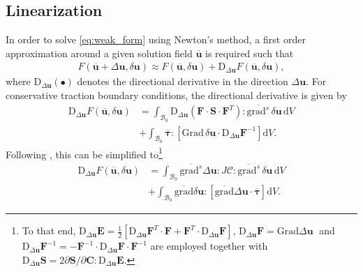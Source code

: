 \documentclass[times,doublespace]{nmeauth}
\newcommand*{\gz}[1]{\boldsymbol{#1}}
\newcommand*{\Grad}{\mathrm{Grad}}
\newcommand*{\grad}{\mathrm{grad}}
\renewcommand*{\d}{\mathrm{d}}
\newcommand*{\D}{\mathrm{D}}
\newcommand*{\mcl}[1]{\mathcal{#1}}
\begin{document}
\subsection{Linearization}

In order to solve \eqref{eq:weak_form} using Newton's method, a first order approximation around a given solution field $\overline{\gz u}$ is required such that
\begin{align}
F(\overline{\gz u} + \Delta \gz u, \delta \gz u) \approx
F(\overline{\gz u}, \delta \gz u) + \D_{\displaystyle \Delta \gz u} F(\overline{\gz u}, \delta \gz u) ,
\end{align}
where $\D_{\displaystyle \Delta \gz u}(\bullet)$ denotes the directional derivative in the direction $\Delta \gz u$.
For conservative traction boundary conditions, the directional derivative is given by
\begin{equation}
\begin{split}
\D_{\displaystyle \Delta \gz u} F(\overline{\gz u}, \delta \gz u)
&=
\int_{\mcl B_0}
\D_{\displaystyle \Delta \gz u} \left(\gz F \cdot \gz S \cdot \gz F^T\right)  :
\overline{\grad^s} \, \delta \gz u
\, \d V
\\
& +
\int_{\mcl B_0}
\overline{\gz \tau} :
\left[
  \Grad \, \delta \gz u \cdot
  \D_{\displaystyle \Delta \gz u} \gz F^{-1}
\right] \d V.
\end{split}
\label{eq:tangent_pre}
\end{equation}
Following \cite{Wriggers2008}, this can be simplified to\footnote{To that end,
$\!\D_{\displaystyle \Delta \gz u} \gz E = \frac{1}{2}\left[\D_{\displaystyle \Delta \gz u} \gz F^T \cdot \gz F + \gz F^T \cdot \D_{\displaystyle \Delta \gz u} \gz F\right]$, $\D_{\displaystyle \Delta \gz u} \gz F = \Grad \Delta \gz u\;$  and
$\!\D_{\displaystyle \Delta \gz u} \gz F^{-1} = - \gz F^{-1} \cdot \D_{\displaystyle \Delta \gz u} \gz F \cdot \gz F^{-1}$
are employed together with
$\D_{\displaystyle \Delta \gz u} \gz S = 2 \partial \gz S / \partial \gz C : \D_{\displaystyle \Delta \gz u} \gz E$.
}
\begin{equation}
  \begin{split}
\D_{\displaystyle \Delta \gz u} F(\overline{\gz u}, \delta \gz u)
  &=
  \int_{\mcl B_0} \overline{\grad^s} \Delta \gz u : J \boldsymbol{\mathcal{C}} : \overline{\grad^s} \, \delta \gz u \, \d V \\
  &+
  \int_{\mcl B_0}
  \overline{\grad}\delta \gz u :
  \left[
  \overline{\grad} \Delta \gz u \cdot
  \overline{\gz \tau}
  \right]
  \d V.
\end{split}
\label{eq:tangent}
\end{equation}
\end{document}
